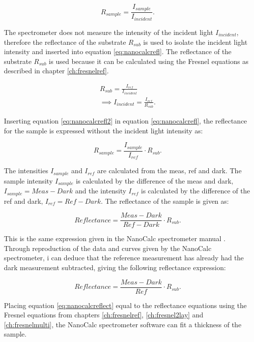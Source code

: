 \documentclass[MasterThesisMain.tex]{subfiles}
\begin{document}
\begin{equation}\label{eq:nanocalcrefl}
R_{sample} = \frac{I_{sample}}{I_{incident}}.
\end{equation}

The spectrometer does not measure the intensity of the incident light $I_{incident}$, therefore the reflectance of the substrate $R_{sub}$ is used to isolate the incident light intensity and inserted into equation \ref{eq:nanocalcrefl}. The reflectance of the substrate $R_{sub}$ is used because it can be calculated using the Fresnel equations as described in chapter \ref{ch:fresnelref}.

\begin{align}
R_{sub} = \frac{I_{ref}}{I_{incident}}\\
\implies  I_{incident} = \frac{I_{ref}}{R_{sub}} \label{eq:nanocalcrefl2}.
\end{align}

Inserting equation \ref{eq:nanocalcrefl2} in equation \ref{eq:nanocalcrefl}, the reflectance for the sample is expressed without the incident light intensity as:

\begin{equation}
R_{sample} = \frac{I_{sample}}{I_{ref}} \cdot R_{sub}.
\end{equation}

The intensities $I_{sample}$ and $I_{ref}$ are calculated from the meas, ref and dark. The sample intensity $I_{sample}$ is calculated by the difference of the meas and dark, $I_{sample}=Meas-Dark$ and the intensity $I_{ref}$ is calculated by the difference of the ref and dark, $I_{ref}=Ref-Dark$. The reflectance of the sample is given as:

\begin{equation}
Reflectance = \frac{Meas-Dark}{Ref-Dark} \cdot R_{sub}.
\end{equation}

This is the same expression given in the NanoCalc spectrometer manual \cite{nanocalcmanual}. Through reproduction of the data and curves given by the NanoCalc spectrometer, i can deduce that the reference measurement has already had the dark measurement subtracted, giving the following reflectance expression:

\begin{equation}\label{eq:nanocalcreflect}
Reflectance = \frac{Meas-Dark}{Ref} \cdot R_{sub}.
\end{equation}

Placing equation \ref{eq:nanocalcreflect} equal to the reflectance equations using the Fresnel equations from chapters  \ref{ch:fresnelref}, \ref{ch:fresnel2lay} and \ref{ch:fresnelmulti}, the NanoCalc spectrometer software can fit a thickness of the sample.
\end{document}
